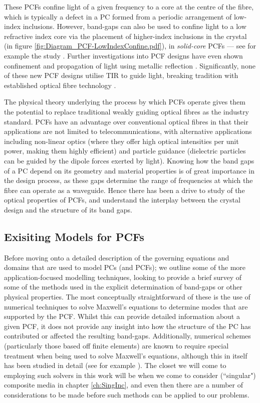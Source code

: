 These PCFs confine light of a given frequency to a core at the centre of the fibre, which is typically a defect in a PC formed from a periodic arrangement of low-index inclusions.
However, band-gaps can also be used to confine light to a low refractive index core via the placement of higher-index inclusions in the crystal (in figure \ref{fig:Diagram_PCF-LowIndexConfine.pdf}), in \emph{solid-core} PCFs --- see for example the study \cite{luan2004allsolid}.
Further investigations into PCF designs have even shown confinement and propagation of light using metallic reflection \cite{hou2008metallic}.
Significantly, none of these new PCF designs utilise TIR to guide light, breaking tradition with established optical fibre technology \cite{knight2003photonic, russell2003photonic}.

The physical theory underlying the process by which PCFs operate gives them the potential to replace traditional weakly guiding optical fibres as the industry standard.
PCFs have an advantage over conventional optical fibres in that their applications are not limited to telecommunications, with alternative applications including non-linear optics (where they offer high optical intensities per unit power, making them highly efficient) and particle guidance (dielectric particles can be guided by the dipole forces exerted by light).
Knowing how the band gaps of a PC depend on its geometry and material properties is of great importance in the design process, as these gaps determine the range of frequencies at which the fibre can operate as a waveguide.
Hence there has been a drive to study of the optical properties of PCFs, and understand the interplay between the crystal design and the structure of its band gaps.

\subsection{Exisiting Models for PCFs} \label{ssec:ExistingPCFModels}
Before moving onto a detailed description of the governing equations and domains that are used to model PCs (and PCFs); we outline some of the more application-focused modelling techniques, looking to provide a brief survey of some of the methods used in the explicit determination of band-gaps or other physical properties.
The most conceptually straightforward of these is the use of numerical techniques to solve Maxwell's equations to determine modes that are supported by the PCF.
Whilst this can provide detailed information about a given PCF, it does not provide any insight into how the structure of the PC has contributed or affected the resulting band-gaps.
Additionally, numerical schemes (particularly those based off finite elements) are known to require special treatment when being used to solve Maxwell's equations, although this in itself has been studied in detail (see for example \cite{monk2003finite}).
The closet we will come to employing such solvers in this work will be when we come to consider (``singular") composite media in chapter \ref{ch:SingInc}, and even then there are a number of considerations to be made before such methods can be applied to our problems.

